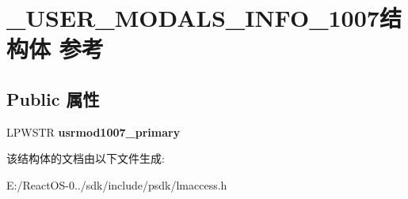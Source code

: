 \hypertarget{struct___u_s_e_r___m_o_d_a_l_s___i_n_f_o__1007}{}\section{\+\_\+\+U\+S\+E\+R\+\_\+\+M\+O\+D\+A\+L\+S\+\_\+\+I\+N\+F\+O\+\_\+1007结构体 参考}
\label{struct___u_s_e_r___m_o_d_a_l_s___i_n_f_o__1007}
\subsection*{Public 属性}
\begin{DoxyCompactItemize}
\item 
\mbox{\label{struct___u_s_e_r___m_o_d_a_l_s___i_n_f_o__1007_aa01f54c96fe31850d4d7630a60eaf7fa}} 
L\+P\+W\+S\+TR {\bfseries usrmod1007\+\_\+primary}
\end{DoxyCompactItemize}


该结构体的文档由以下文件生成\+:\begin{DoxyCompactItemize}
\item 
E\+:/\+React\+O\+S-\/0../sdk/include/psdk/lmaccess.\+h\end{DoxyCompactItemize}
